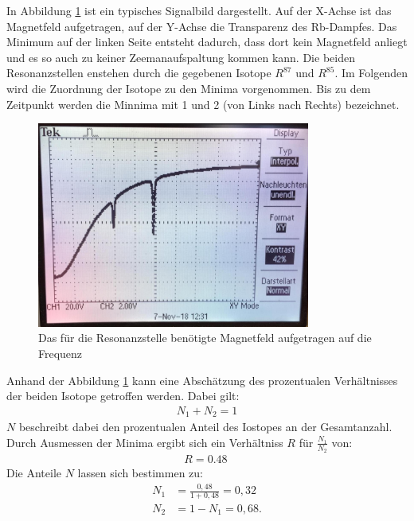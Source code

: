 In Abbildung \ref{fig:bild} ist ein typisches Signalbild dargestellt.
Auf der X-Achse ist das Magnetfeld aufgetragen, auf der Y-Achse die Transparenz des Rb-Dampfes.
Das Minimum auf der linken Seite entsteht dadurch, dass dort kein Magnetfeld anliegt und es so auch zu keiner Zeemanaufspaltung kommen kann.
Die beiden Resonanzstellen enstehen durch die gegebenen Isotope $R^{87}$ und $R^{85}$.
Im Folgenden wird die Zuordnung der Isotope zu den Minima vorgenommen.
Bis zu dem Zeitpunkt werden die Minnima mit 1 und 2 (von Links nach Rechts) bezeichnet.
\begin{figure}[h!]
  \centering
  \includegraphics[width=0.8\textwidth]{bild.jpeg}
  \caption{Das für die Resonanzstelle benötigte Magnetfeld aufgetragen auf die Frequenz}
  \label{fig:bild}
\end{figure}
Anhand der Abbildung \ref{fig:bild} kann eine Abschätzung des prozentualen Verhältnisses der beiden Isotope getroffen werden.
Dabei gilt:
\begin{align*}
  N_1+N_2 = 1
\end{align*}
$N$ beschreibt dabei den prozentualen Anteil des Iostopes an der Gesamtanzahl.
Durch Ausmessen der Minima ergibt sich ein Verhältniss $R$ für $\frac{N_1}{N_2}$ von:
\begin{align*}
  R=\SI{0.48}{}
\end{align*}
Die Anteile $N$ lassen sich bestimmen zu:
\begin{align*}
  N_1&=\frac{0,48}{1+0,48}=0,32\\
  N_2&=1-N_1=0,68.
\end{align*}


